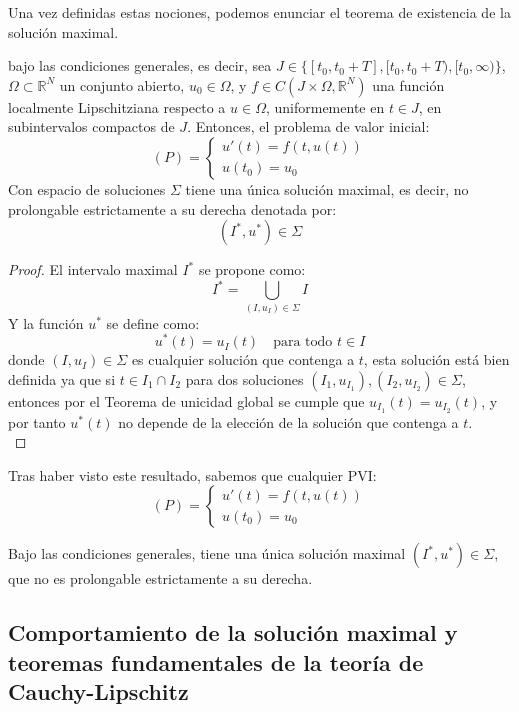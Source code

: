 Una vez definidas estas nociones, podemos enunciar el teorema de existencia de la solución maximal.

\begin{teorema}
    bajo las condiciones generales, es decir, sea $J \in \{ [t_0, t_0 + T], [t_0, t_0 + T), [t_0, \infty) \}$, $\Omega \subset \mathbb{R}^N$ un conjunto abierto, $u_0 \in \Omega$, y $f \in C(J \times \Omega, \mathbb{R}^N)$ una función localmente Lipschitziana respecto a $u \in \Omega$, uniformemente en $t \in J$, en subintervalos compactos de $J$. Entonces, el problema de valor inicial:
    \[
        (P) =
        \begin{cases}
            u'(t) = f(t, u(t)) \\
            u(t_0) = u_0
        \end{cases}
    \]
    Con espacio de soluciones $\Sigma$ tiene una única solución maximal, es decir, no prolongable estrictamente a su derecha denotada por:
    \[  
        \boxed{(I^*, u^*) \in \Sigma}
    \]
\end{teorema}

\begin{proof}
    El intervalo maximal $I^*$ se propone como:
    \[
        I^* = \bigcup_{(I, u_I) \in \Sigma} I
    \]
    Y la función $u^*$ se define como:
    \[
        u^*(t) = u_I(t) \quad \text{para todo } t \in I
    \]
    donde $(I, u_I) \in \Sigma$ es cualquier solución que contenga a $t$, esta solución está bien definida ya que si $t \in I_1 \cap I_2$ para dos soluciones $(I_1, u_{I_1}), (I_2, u_{I_2}) \in \Sigma$, entonces por el Teorema de unicidad global se cumple que $u_{I_1}(t) = u_{I_2}(t)$, y por tanto $u^*(t)$ no depende de la elección de la solución que contenga a $t$.\\
\end{proof}

Tras haber visto este resultado, sabemos que cualquier PVI:
\[
    (P) =
    \begin{cases}
        u'(t) = f(t, u(t)) \\
        u(t_0) = u_0
    \end{cases}
\]

Bajo las condiciones generales, tiene una única solución maximal $(I^*, u^*) \in \Sigma$, que no es prolongable estrictamente a su derecha.

\subsection{Comportamiento de la solución maximal y teoremas fundamentales de la teoría de Cauchy-Lipschitz}

